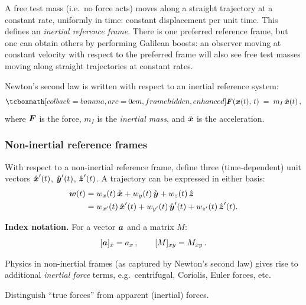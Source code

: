 \begin{center}
\end{center}

A free test mass (i.e.\ no force acts) moves along a straight trajectory
at a constant rate, uniformly in time: constant displacement per unit
time.  This defines an \emph{inertial reference frame}.  There is one
preferred reference frame, but one can obtain others by performing
Galilean boosts: an observer moving at constant velocity with respect
to the preferred frame will also see free test masses moving along
straight trajectories at constant rates.

Newton's second law is written with respect to an inertial reference system:
\begin{equation}\label{eq:newton2}
  \eqbox{\vb{F}(\vb{x}(t),\, t) \;=\; m_I\, \ddt{\vb{x}}(t)\,,}
\end{equation}
where $\boldsymbol{F}$ is the force, $m_I$ is the \emph{inertial mass}, and
$\ddot{\boldsymbol{x}}$ is the acceleration.

\subsubsection{Non-inertial reference frames}
With respect to a non-inertial reference frame, define three
(time-dependent) unit vectors $\hat{\boldsymbol{x}}'(t)$, $\hat{\boldsymbol{y}}'(t)$, $\hat{\boldsymbol{z}}'(t)$.
A trajectory can be expressed in either basis:
\begin{align}
  \boldsymbol{w}(t) &= w_x(t)\,\hat{\boldsymbol{x}} + w_y(t)\,\hat{\boldsymbol{y}} + w_z(t)\,\hat{\boldsymbol{z}}
  \label{eq:traj-inertial}\\
  &= w_{x'}(t)\,\hat{\boldsymbol{x}}'(t) + w_{y'}(t)\,\hat{\boldsymbol{y}}'(t) + w_{z'}(t)\,\hat{\boldsymbol{z}}'(t).
  \label{eq:traj-noninertial}
\end{align}

\noindent\textbf{Index notation.}
For a vector $\boldsymbol{a}$ and a matrix $M$:
\[
  [\boldsymbol{a}]_x = a_x\,,\qquad
  [M]_{xy} = M_{xy}\,.
\]

Physics in non-inertial frames (as captured by Newton's second law) gives
rise to additional \emph{inertial force} terms, e.g.\ centrifugal,
Coriolis, Euler forces, etc.

\begin{exercise}
  Distinguish ``true forces'' from apparent (inertial) forces.
\end{exercise}

